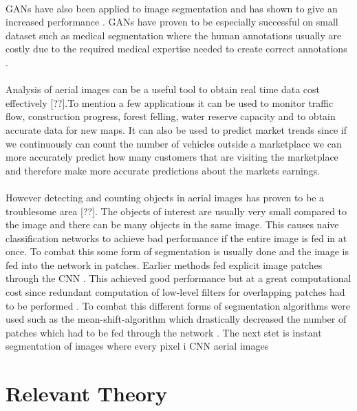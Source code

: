 \documentclass[a4paper,11pt]{article}
\begin{document}
\\
GANs have also been applied to image segmentation and has shown to give an increased performance \cite{luc_semantic_2016, souly_semi_2017}. GANs have proven to be especially successful on small dataset such as medical segmentation where the human annotations usually are costly due to the required medical expertise needed to create correct annotations \cite{souly_semi_2017, xue_segan:_2017-1, yang_automatic_2017-1, rezaei_conditional_2017-1, arbelle_microscopy_2017-1}.\\
\\
Analysis of aerial images can be a useful tool to obtain real time data cost effectively [??].To mention a few applications it can be used to monitor traffic flow, construction progress, forest felling, water reserve capacity and to obtain accurate data for new maps. It can also be used to predict market trends since if we continuously can count the number of vehicles outside a marketplace we can more accurately predict how many customers that are visiting the marketplace and therefore make more accurate predictions about the markets earnings.\\
\\
However detecting and counting objects in aerial images has proven to be a troublesome area [??]. The objects of interest are usually very small compared to the image and there can be many objects in the same image. This causes naive classification networks to achieve bad performance if the entire image is fed in at once. To combat this some form of segmentation is usually done and the image is fed into the network in patches. Earlier methods fed explicit image patches through the CNN \cite{holt_object-based_2009}. This achieved good performance but at a great computational cost since redundant computation of low-level filters for overlapping patches had to be performed \cite{luc_semantic_2016}. To combat this different forms of segmentation algorithms were used such as the mean-shift-algorithm which drastically decreased the number of patches which had to be fed through the network \cite{ammour_deep_2017}.
The next stet is instant segmentation of images where every pixel i CNN aerial images \cite{audebert_segment-before-detect:_2017, holt_object-based_2009, zhong_robust_2017}
\section{Relevant Theory}
\end{document}
